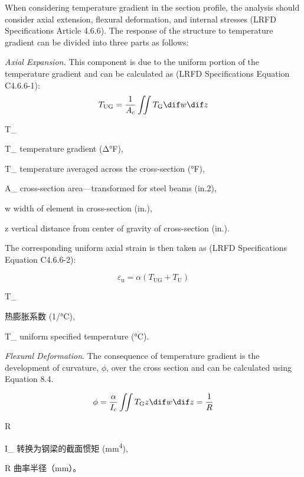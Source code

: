 When considering temperature gradient in the section profile, the analysis should consider axial extension, flexural deformation, and internal stresses (LRFD Specifications Article 4.6.6). The response of the structure to
temperature gradient can be divided into three parts as follows:

\emph{Axial Expansion.} This component is due to the uniform portion of the temperature gradient and can be calculated as (LRFD Specifications Equation C4.6.6-1):
\begin{equation}
  T_\text{UG} = \frac{1}{A_\text{c}} \iint T_\text{G} \dif w \dif z
\end{equation}
\begin{EqDesc}{T_}
  \item [T_\text{G}] temperature gradient (Δ°F),
  \item [T_\text{UG}] temperature averaged across the cross-section (°F),
  \item [A_\text{c}] cross-section area—transformed for steel beams (in.2),
  \item [w] width of element in cross-section (in.),
  \item [z] vertical distance from center of gravity of cross-section (in.).
\end{EqDesc}

The corresponding uniform axial strain is then taken as (LRFD Specifications Equation C4.6.6-2):

\begin{equation}
 \varepsilon_\text{u} = \alpha (T_\text{UG} + T_\text{U})
\end{equation}
\begin{EqDesc}{T_}
  \item[\alpha] 热膨胀系数 (\unit{1/\celsius}),
  \item[T_\text{U}] uniform specified temperature (\unit{\celsius}).
\end{EqDesc}

\emph{Flexural Deformation}. The consequence of temperature gradient is the development of curvature, $\phi$, over the cross section and can be calculated using Equation 8.4.

\begin{equation}
  \phi = \frac{\alpha}{I_\text{c}} \iint T_\text{G} z \dif w \dif z =\frac{1}{R}
\end{equation}
\begin{EqDesc}{R}
  \item[I_\text{c}] 转换为钢梁的截面惯矩 (\unit{mm^4}),
  \item[R] 曲率半径（\unit{mm}）。
\end{EqDesc}

